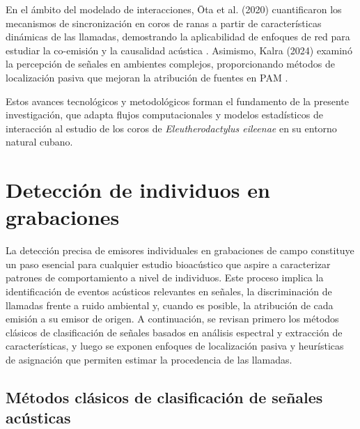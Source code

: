 En el ámbito del modelado de interacciones, Ōta et al. (2020) 
cuantificaron los mecanismos de sincronización en coros de 
ranas a partir de características dinámicas de las llamadas, 
demostrando la aplicabilidad de enfoques de red para estudiar 
la co-emisión y la causalidad acústica 
\cite{ota2020interaction}. Asimismo, Kalra (2024) examinó la 
percepción de señales en ambientes complejos, proporcionando 
métodos de localización pasiva que mejoran la atribución de 
fuentes en PAM \cite{kalra2024signal}.

Estos avances tecnológicos y metodológicos forman el 
fundamento de la presente investigación, que adapta flujos 
computacionales y modelos estadísticos de interacción al 
estudio de los coros de \emph{Eleutherodactylus eileenae} en 
su entorno natural cubano.



\section{Detección de individuos en grabaciones}
\label{sec:deteccion_individuos}



La detección precisa de emisores individuales en grabaciones 
de campo constituye un paso esencial para cualquier estudio 
bioacústico que aspire a caracterizar patrones de 
comportamiento a nivel de individuos. Este proceso implica la 
identificación de eventos acústicos relevantes en señales, 
la discriminación de llamadas frente a ruido ambiental y, 
cuando es posible, la atribución de cada emisión a su emisor 
de origen. A continuación, se revisan primero los métodos 
clásicos de clasificación de señales basados en análisis 
espectral y extracción de características, y luego se exponen 
enfoques de localización pasiva y heurísticas de asignación 
que permiten estimar la procedencia de las llamadas.

\subsection{Métodos clásicos de clasificación de señales acústicas}

